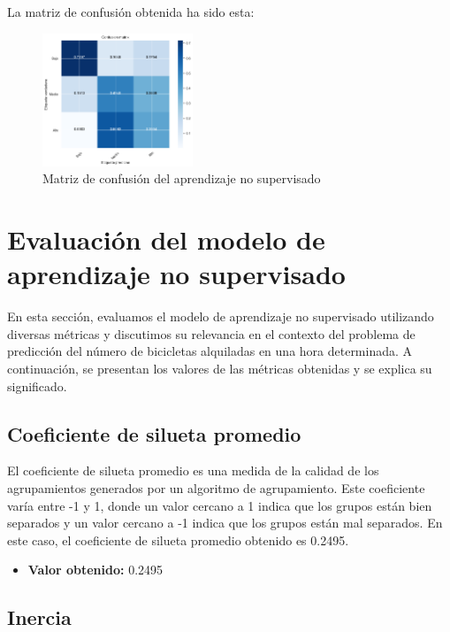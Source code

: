 \documentclass{wsdcr}
\begin{document}
La matriz de confusión obtenida ha sido esta:
\begin{figure}[h]
    \centering
    \includegraphics[width=0.4\textwidth]{charts/normalized/kmn_matrix_confussion.png}
    \caption{Matriz de confusión del aprendizaje no supervisado}
    \label{fig:kmnmatrizconfussion}
\end{figure}

\section{Evaluación del modelo de aprendizaje no supervisado}

En esta sección, evaluamos el modelo de aprendizaje no supervisado utilizando diversas métricas y discutimos su relevancia en el contexto del problema de predicción del número de bicicletas alquiladas en una hora determinada. A continuación, se presentan los valores de las métricas obtenidas y se explica su significado.

\subsection{Coeficiente de silueta promedio}

El coeficiente de silueta promedio es una medida de la calidad de los agrupamientos generados por un algoritmo de agrupamiento. Este coeficiente varía entre -1 y 1, donde un valor cercano a 1 indica que los grupos están bien separados y un valor cercano a -1 indica que los grupos están mal separados. En este caso, el coeficiente de silueta promedio obtenido es 0.2495.

\begin{itemize}
    \item \textbf{Valor obtenido:} 0.2495
\end{itemize}

\subsection{Inercia}
\end{document}

